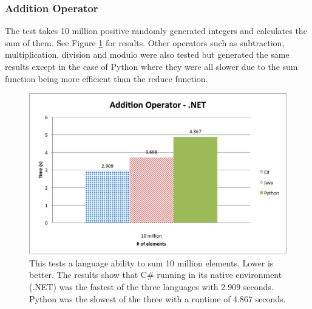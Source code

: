 \subsubsection{Addition Operator}

The test takes 10 million positive randomly generated integers and calculates the sum of them. See Figure \ref{fig:net_addition} for results. Other operators such as subtraction, multiplication, division and modulo were also tested but generated the same results except in the case of Python where they were all slower due to the sum function being more efficient than the reduce function.

\begin{figure}[h]
	\centering
	\includegraphics[width=1.0\linewidth]{chapters/new_media/AdditionOperatorNet.png}
	\caption{This tests a language ability to sum 10 million elements. Lower is better. The results show that C\# running in its native environment (.NET) was the fastest of the three languages with 2.909 seconds. Python was the slowest of the three with a runtime of 4.867 seconds.}
	\label{fig:net_addition}
\end{figure}

